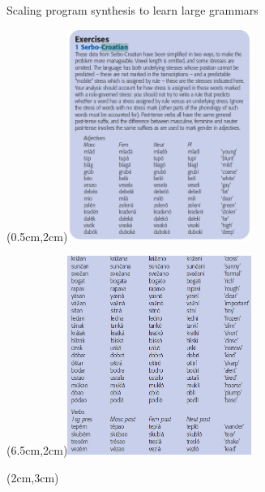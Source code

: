 \documentclass{beamer}
\begin{document}
\begin{frame}{Scaling program synthesis to learn large grammars}
  
  \begin{textblock*}{10cm}(0.5cm,2cm)\includegraphics[width=6cm]{Croatian1.png}\end{textblock*}
  \begin{textblock*}{10cm}(6.5cm,2cm)\includegraphics[width=6cm]{Croatian2.png}\end{textblock*}
  
  \begin{textblock*}{10cm}(2cm,3cm)
\end{textblock*}
\end{frame}
\end{document}
